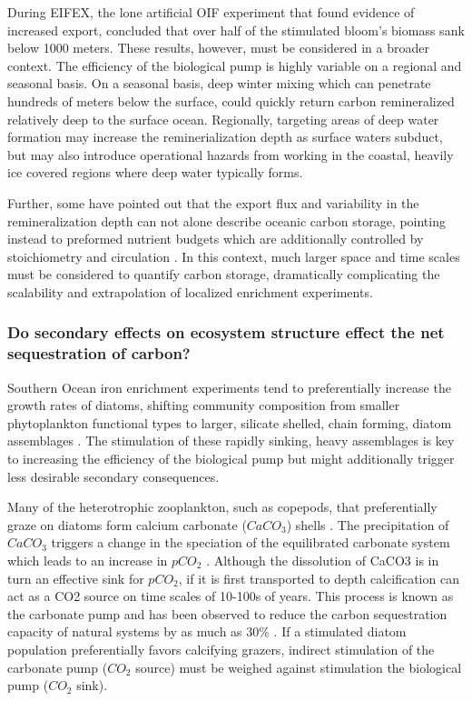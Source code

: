 During EIFEX, the lone artificial OIF experiment that found evidence of increased export, \textcite{SmetacekDeepcarbonexport2012} concluded that over half of the stimulated bloom’s biomass sank below 1000 meters. These results, however, must be considered in a broader context. The efficiency of the biological pump is highly variable on a regional and seasonal basis. On a seasonal basis, deep winter mixing which can penetrate hundreds of meters below the surface, could quickly return carbon remineralized relatively deep to the surface ocean. Regionally, targeting areas of deep water formation may increase the reminerialization depth as surface waters subduct, but may also introduce operational hazards from working in the coastal, heavily ice covered regions where deep water typically forms.

Further, some have pointed out that the export flux and variability in the remineralization depth can not alone describe oceanic carbon storage, pointing instead to preformed nutrient budgets which are additionally controlled by stoichiometry and circulation \parencite{GnanadesikanExportnotenough2008}. In this context, much larger space and time scales must be considered to quantify carbon storage, dramatically complicating the scalability and extrapolation of localized enrichment experiments.  


\subsubsection{Do secondary effects on ecosystem structure effect the net sequestration of carbon?}

Southern Ocean iron enrichment experiments tend to preferentially increase the growth rates of diatoms, shifting community composition from smaller phytoplankton functional types to larger, silicate shelled, chain forming, diatom assemblages \parencite{HutchinsIronlimiteddiatomgrowth1998,HoffmannDifferentreactionsSouthern2006}. The stimulation of these rapidly sinking, heavy assemblages is key to increasing the efficiency of the biological pump \parencite{HoffmannDifferentreactionsSouthern2006} but might additionally trigger less desirable secondary consequences.  

Many of the heterotrophic zooplankton, such as copepods, that preferentially graze on diatoms form calcium carbonate ($CaCO_3$) shells \parencite{TsudaEvidencegrazinghypothesis2007}. The precipitation of $CaCO_3$ triggers a change in the speciation of the equilibrated carbonate system which leads to an increase in $pCO_2$ \parencite{FrankignoulleMarinecalcificationsource1994}. Although the dissolution of CaCO3 is in turn an effective sink for $pCO_2$, if it is first transported to depth calcification can act as a CO2 source on time scales of 10-100s of years. This process is known as the carbonate pump and has been observed to reduce the carbon sequestration capacity of natural systems by as much as 30\% \parencite{SalterCarbonatecounterpump2014}. If a stimulated diatom population preferentially favors calcifying grazers, indirect stimulation of the carbonate pump ($CO_2$ source) must be weighed against stimulation the biological pump ($CO_2$ sink).

